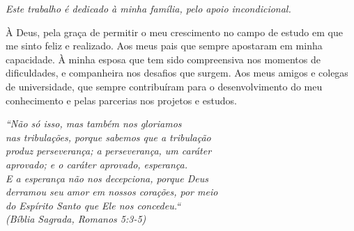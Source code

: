 \begin{folhadeaprovacao}
   \begin{center}
    \vspace*{0.5cm}
    {\large\imprimirlocal}
    \par
    {\large\imprimirdata}
    \vspace*{1cm}
  \end{center}
  
\end{folhadeaprovacao}

\begin{dedicatoria}
   \vspace*{\fill}
   \centering
   \noindent
   \textit{ Este trabalho é dedicado à minha família, pelo apoio incondicional.} \vspace*{\fill}
\end{dedicatoria}

\begin{agradecimentos}
À Deus, pela graça de permitir o meu crescimento no campo de estudo em que me sinto feliz e realizado.
Aos meus pais que sempre apostaram em minha capacidade.
À minha esposa que tem sido compreensiva nos momentos de dificuldades, e companheira nos desafios que surgem.
Aos meus amigos e colegas de universidade, que sempre contribuíram para o desenvolvimento do meu conhecimento e pelas parcerias nos projetos e estudos.


\end{agradecimentos}

\begin{epigrafe}
    \vspace*{\fill}
	\begin{flushright}
		\textit{``Não só isso, mas também nos gloriamos \\
			nas tribulações, porque sabemos que a tribulação\\
			produz perseverança; a perseverança, um caráter \\
			aprovado; e o caráter aprovado, esperança. \\
			E a esperança não nos decepciona, porque Deus \\
			derramou seu amor em nossos corações, por meio \\
			do Espírito Santo que Ele nos concedeu.``\\
			(Bíblia Sagrada, Romanos 5:3-5)}
			
	\end{flushright}
\end{epigrafe}

